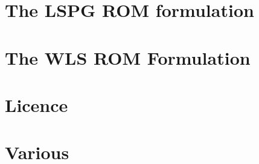 \let\mypdfximage\pdfximage\def\pdfximage{\immediate\mypdfximage}\documentclass[twoside]{book}
\newcommand{\+}{\discretionary{\mbox{\scriptsize$\hookleftarrow$}}{}{}}
\newcommand{\clearemptydoublepage}{%
  \newpage{\pagestyle{empty}\cleardoublepage}%
}
\begin{document}
\chapter{The LSPG ROM formulation}
\label{md_pages_revise_and_pick_various_formulation_lspg}

\chapter{The WLS ROM Formulation}
\label{md_pages_revise_and_pick_various_formulation_wls}

\chapter{Licence}
\label{md_pages_revise_and_pick_various_license}

\chapter{Various}
\label{md_pages_revise_and_pick_various}


\backmatter
\newpage
{}
\clearemptydoublepage
{}
\printindex
\end{document}
